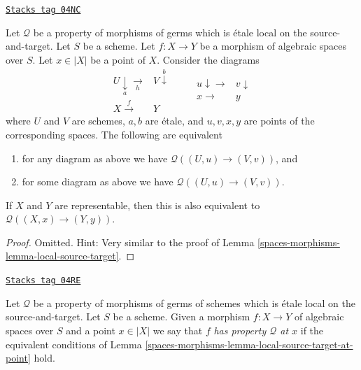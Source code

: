 \begin{lemma}
\label{spaces-morphisms-lemma-local-source-target-at-point}
\href{https://stacks.math.columbia.edu/tag/04NC}{\texttt{Stacks tag 04NC}}

Let $\mathcal{Q}$ be a property of morphisms of germs which is
\'etale local on the source-and-target.
Let $S$ be a scheme.
Let $f : X \to Y$ be a morphism of algebraic spaces over $S$.
Let $x \in |X|$ be a point of $X$.
Consider the diagrams
$$
\begin{array}{cc}U \underset{a}{\downarrow}\underset{h}{\longrightarrow} & V \overset{b}{\downarrow} \\ X \overset{f}{\longrightarrow} & Y\end{array}
\quad\quad
\begin{array}{cc}u \downarrow\longrightarrow & v \downarrow \\ x \longrightarrow & y\end{array}
$$
where $U$ and $V$ are schemes, $a, b$ are \'etale, and $u, v, x, y$
are points of the corresponding spaces.
The following are equivalent
\begin{enumerate}
\item for any diagram as above we have $\mathcal{Q}((U, u) \to (V, v))$, and
\item for some diagram as above we have $\mathcal{Q}((U, u) \to (V, v))$.
\end{enumerate}
If $X$ and $Y$ are representable, then this is also
equivalent to $\mathcal{Q}((X, x) \to (Y, y))$.
\end{lemma}

\begin{proof}
Omitted. Hint: Very similar to the proof of
Lemma \ref{spaces-morphisms-lemma-local-source-target}.
\end{proof}

\begin{definition}[P at point]
\label{spaces-morphisms-definition-P-at-point}
\href{https://stacks.math.columbia.edu/tag/04RE}{\texttt{Stacks tag 04RE}}

Let $\mathcal{Q}$ be a property of morphisms of germs
of schemes which is \'etale local on the source-and-target.
Let $S$ be a scheme.
Given a morphism $f : X \to Y$ of algebraic spaces over $S$ and
a point $x \in |X|$ we say that $f$
{\it has property $\mathcal{Q}$ at $x$} if the equivalent conditions of
Lemma \ref{spaces-morphisms-lemma-local-source-target-at-point}
hold.
\end{definition}

